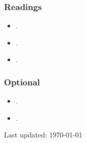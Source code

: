 \documentclass[abstract=on,parskip=full,headings=standardclasses,fontsize=11pt,paper=a4]{scrartcl}
\begin{document}
\subsubsection*{Readings}
\begin{itemize}
\item {}.
\item {}.
\item {}.
\end{itemize}

\subsubsection*{Optional}

\begin{itemize}
\item {}.
\item {}.
\end{itemize}



\sloppy
\renewcommand*{\bibfont}{\small}

\setlength{\bibitemsep}{0.2em} %
\printbibliography

\bigskip

\begin{center}
Last updated: \today
\end{center}
\end{document}
